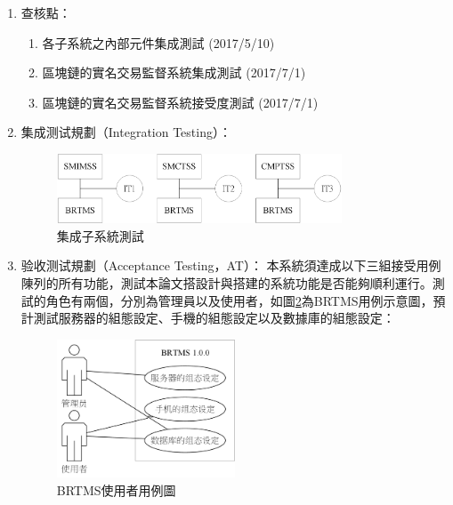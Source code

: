 \begin{enumerate}
	 			\begin{enumerate}
	 				\item 各子系統之內部元件集成測試 (Module Test)(2017/2/25~2017/6/8)
	 				\item 區塊鏈的實名交易監督系統集成測試 (Integration Test) (2017/6/8~2017/6/21)
	 				\item 區塊鏈的實名交易監督系統接受度測試 (Acceptance Test) (2017/7/10~2017/7/21)
				\end{enumerate}

			\item 查核點：

				\begin{enumerate}
	 				\item 各子系統之內部元件集成測試 (2017/5/10)
	 				\item 區塊鏈的實名交易監督系統集成測試 (2017/7/1)
	 				\item 區塊鏈的實名交易監督系統接受度測試 (2017/7/1)
	 			\end{enumerate}

	 		\item 集成测试規劃（Integration Testing）：
	 			\begin{figure}[htbp]
					\centering
					\includegraphics[width = 0.8\textwidth]{IntegrationTesting.png}
					\caption{集成子系統測試}\label{IntegrationTesting}
				\end{figure}
			\item 验收测试規劃（Acceptance Testing，AT）：
				本系統須達成以下三組接受用例陳列的所有功能，測試本論文搭設計與搭建的系統功能是否能夠順利運行。測試的角色有兩個，分別為管理員以及使用者，如圖\ref{usecasediagram}為BRTMS用例示意圖，預計測試服務器的組態設定、手機的組態設定以及數據庫的組態設定：

					\begin{figure}[htbp]
						\centering
						\includegraphics[width = 0.5\textwidth]{usecasediagram.png}
						\caption{BRTMS使用者用例圖}\label{usecasediagram}
					\end{figure}


\end{enumerate}
